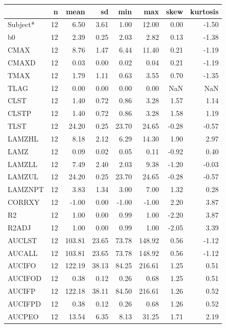 \documentclass[
  12pt,
]{krantz}
\begin{document}
\begin{tabular}{l|r|r|r|r|r|r|r}
\hline
  & n & mean & sd & min & max & skew & kurtosis\\
\hline
Subject* & 12 & 6.50 & 3.61 & 1.00 & 12.00 & 0.00 & -1.50\\
\hline
b0 & 12 & 2.39 & 0.25 & 2.03 & 2.82 & 0.13 & -1.38\\
\hline
CMAX & 12 & 8.76 & 1.47 & 6.44 & 11.40 & 0.21 & -1.19\\
\hline
CMAXD & 12 & 0.03 & 0.00 & 0.02 & 0.04 & 0.21 & -1.19\\
\hline
TMAX & 12 & 1.79 & 1.11 & 0.63 & 3.55 & 0.70 & -1.35\\
\hline
TLAG & 12 & 0.00 & 0.00 & 0.00 & 0.00 & NaN & NaN\\
\hline
CLST & 12 & 1.40 & 0.72 & 0.86 & 3.28 & 1.57 & 1.14\\
\hline
CLSTP & 12 & 1.40 & 0.72 & 0.86 & 3.28 & 1.58 & 1.19\\
\hline
TLST & 12 & 24.20 & 0.25 & 23.70 & 24.65 & -0.28 & -0.57\\
\hline
LAMZHL & 12 & 8.18 & 2.12 & 6.29 & 14.30 & 1.90 & 2.97\\
\hline
LAMZ & 12 & 0.09 & 0.02 & 0.05 & 0.11 & -0.92 & 0.40\\
\hline
LAMZLL & 12 & 7.49 & 2.40 & 2.03 & 9.38 & -1.20 & -0.03\\
\hline
LAMZUL & 12 & 24.20 & 0.25 & 23.70 & 24.65 & -0.28 & -0.57\\
\hline
LAMZNPT & 12 & 3.83 & 1.34 & 3.00 & 7.00 & 1.32 & 0.28\\
\hline
CORRXY & 12 & -1.00 & 0.00 & -1.00 & -1.00 & 2.20 & 3.87\\
\hline
R2 & 12 & 1.00 & 0.00 & 0.99 & 1.00 & -2.20 & 3.87\\
\hline
R2ADJ & 12 & 1.00 & 0.00 & 0.99 & 1.00 & -2.05 & 3.39\\
\hline
AUCLST & 12 & 103.81 & 23.65 & 73.78 & 148.92 & 0.56 & -1.12\\
\hline
AUCALL & 12 & 103.81 & 23.65 & 73.78 & 148.92 & 0.56 & -1.12\\
\hline
AUCIFO & 12 & 122.19 & 38.13 & 84.25 & 216.61 & 1.25 & 0.51\\
\hline
AUCIFOD & 12 & 0.38 & 0.12 & 0.26 & 0.68 & 1.25 & 0.51\\
\hline
AUCIFP & 12 & 122.18 & 38.11 & 84.50 & 216.61 & 1.26 & 0.52\\
\hline
AUCIFPD & 12 & 0.38 & 0.12 & 0.26 & 0.68 & 1.26 & 0.52\\
\hline
AUCPEO & 12 & 13.54 & 6.35 & 8.13 & 31.25 & 1.71 & 2.19\\

\end{tabular}
\end{document}
